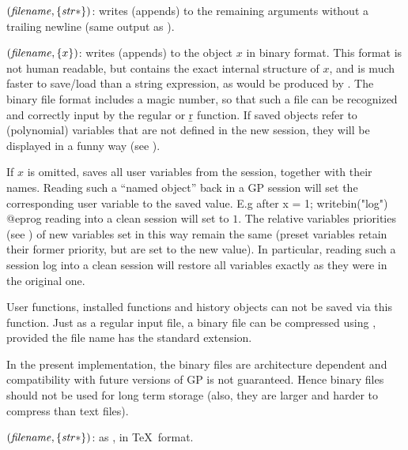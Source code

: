 $(\hbox{\it filename\/},\{\hbox{\it str\/}*\})$: writes (appends) to
 the remaining arguments without a trailing newline
(same output as ).

$(\hbox{\it filename\/},\{x\})$: writes (appends) to
 the object $x$ in binary format. This format is not human
readable, but contains the exact internal structure of $x$, and is much
faster to save/load than a string expression, as would be produced by
. The binary file format includes a magic number, so that such a
file can be recognized and correctly input by the regular  or \b{r}
function. If saved objects refer to (polynomial) variables that are not
defined in the new session, they will be displayed in a funny way (see
).

If $x$ is omitted, saves all user variables from the session, together with
their names. Reading such a ``named object'' back in a GP session will set
the corresponding user variable to the saved value. E.g after
\bprog
x = 1; writebin("log")
@eprog
\noindent reading  into a clean session will set  to $1$.
The relative variables priorities (see ) of new variables
set in this way remain the same (preset variables retain their former
priority, but are set to the new value). In particular, reading such a
session log into a clean session will restore all variables exactly as they
were in the original one.

User functions, installed functions and history objects can not be saved via
this function. Just as a regular input file, a binary file can be compressed
using , provided the file name has the standard 
extension. \label{se:writebin}

In the present implementation, the binary files are architecture dependent
and compatibility with future versions of GP is not guaranteed. Hence
binary files should not be used for long term storage (also, they are
larger and harder to compress than text files).

$(\hbox{\it filename\/},\{\hbox{\it str\/}*\})$: as ,
in \TeX\ format.\label{se:writetex}

\vfill\eject
